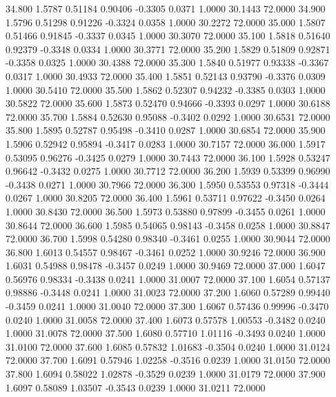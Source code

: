   34.800   1.5787   0.51184   0.90406  -0.3305   0.0371   1.0000  30.1443  72.0000
  34.900   1.5796   0.51298   0.91226  -0.3324   0.0358   1.0000  30.2272  72.0000
  35.000   1.5807   0.51466   0.91845  -0.3337   0.0345   1.0000  30.3070  72.0000
  35.100   1.5818   0.51640   0.92379  -0.3348   0.0334   1.0000  30.3771  72.0000
  35.200   1.5829   0.51809   0.92871  -0.3358   0.0325   1.0000  30.4388  72.0000
  35.300   1.5840   0.51977   0.93338  -0.3367   0.0317   1.0000  30.4933  72.0000
  35.400   1.5851   0.52143   0.93790  -0.3376   0.0309   1.0000  30.5410  72.0000
  35.500   1.5862   0.52307   0.94232  -0.3385   0.0303   1.0000  30.5822  72.0000
  35.600   1.5873   0.52470   0.94666  -0.3393   0.0297   1.0000  30.6188  72.0000
  35.700   1.5884   0.52630   0.95088  -0.3402   0.0292   1.0000  30.6531  72.0000
  35.800   1.5895   0.52787   0.95498  -0.3410   0.0287   1.0000  30.6854  72.0000
  35.900   1.5906   0.52942   0.95894  -0.3417   0.0283   1.0000  30.7157  72.0000
  36.000   1.5917   0.53095   0.96276  -0.3425   0.0279   1.0000  30.7443  72.0000
  36.100   1.5928   0.53247   0.96642  -0.3432   0.0275   1.0000  30.7712  72.0000
  36.200   1.5939   0.53399   0.96990  -0.3438   0.0271   1.0000  30.7966  72.0000
  36.300   1.5950   0.53553   0.97318  -0.3444   0.0267   1.0000  30.8205  72.0000
  36.400   1.5961   0.53711   0.97622  -0.3450   0.0264   1.0000  30.8430  72.0000
  36.500   1.5973   0.53880   0.97899  -0.3455   0.0261   1.0000  30.8644  72.0000
  36.600   1.5985   0.54065   0.98143  -0.3458   0.0258   1.0000  30.8847  72.0000
  36.700   1.5998   0.54280   0.98340  -0.3461   0.0255   1.0000  30.9044  72.0000
  36.800   1.6013   0.54557   0.98467  -0.3461   0.0252   1.0000  30.9246  72.0000
  36.900   1.6031   0.54988   0.98478  -0.3457   0.0249   1.0000  30.9469  72.0000
  37.000   1.6047   0.56976   0.98334  -0.3438   0.0241   1.0000  31.0007  72.0000
  37.100   1.6054   0.57137   0.98886  -0.3448   0.0241   1.0000  31.0023  72.0000
  37.200   1.6060   0.57289   0.99440  -0.3459   0.0241   1.0000  31.0040  72.0000
  37.300   1.6067   0.57436   0.99996  -0.3470   0.0240   1.0000  31.0058  72.0000
  37.400   1.6073   0.57578   1.00553  -0.3482   0.0240   1.0000  31.0078  72.0000
  37.500   1.6080   0.57710   1.01116  -0.3493   0.0240   1.0000  31.0100  72.0000
  37.600   1.6085   0.57832   1.01683  -0.3504   0.0240   1.0000  31.0124  72.0000
  37.700   1.6091   0.57946   1.02258  -0.3516   0.0239   1.0000  31.0150  72.0000
  37.800   1.6094   0.58022   1.02878  -0.3529   0.0239   1.0000  31.0179  72.0000
  37.900   1.6097   0.58089   1.03507  -0.3543   0.0239   1.0000  31.0211  72.0000
